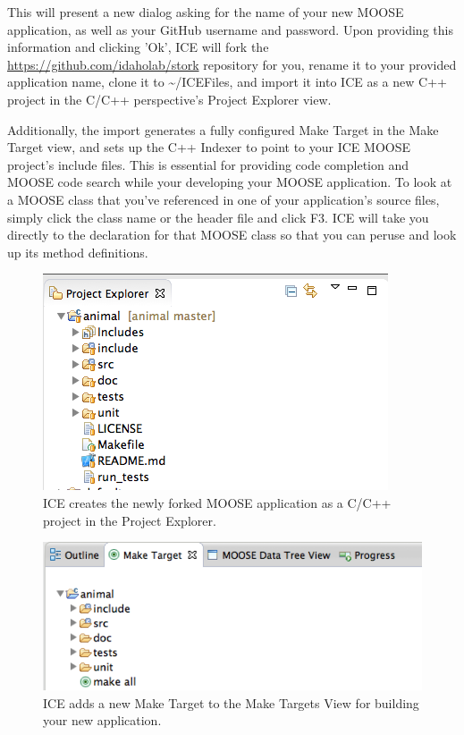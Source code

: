 This will present a new dialog asking for the name of your new MOOSE
application, as well as your GitHub username and password. Upon
providing this information and clicking 'Ok', ICE will fork the
\url{https://github.com/idaholab/stork} repository for you, rename it to
your provided application name, clone it to \textasciitilde{}/ICEFiles,
and import it into ICE as a new C++ project in the C/C++ perspective's
Project Explorer view.

Additionally, the import generates a fully configured Make Target in the
Make Target view, and sets up the C++ Indexer to point to your ICE MOOSE
project's include files. This is essential for providing code completion
and MOOSE code search while your developing your MOOSE application. To
look at a MOOSE class that you've referenced in one of your
application's source files, simply click the class name or the header
file and click F3. ICE will take you directly to the declaration for
that MOOSE class so that you can peruse and look up its method
definitions.

\begin{figure}[htbp]
\centering
\includegraphics[width=\textwidth]{figures/new_app.png}
\caption{ICE creates the newly forked MOOSE application as a C/C++ project in the Project Explorer.}
\end{figure}
\begin{figure}[htbp]
\centering
\includegraphics[width=\textwidth]{figures/make_target.png}
\caption{ICE adds a new Make Target to the Make Targets View for building your new application.}
\end{figure}

